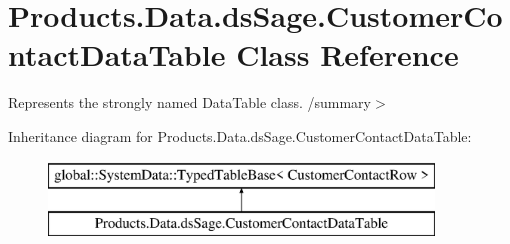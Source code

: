 \hypertarget{class_products_1_1_data_1_1ds_sage_1_1_customer_contact_data_table}{}\section{Products.\+Data.\+ds\+Sage.\+Customer\+Contact\+Data\+Table Class Reference}
\label{class_products_1_1_data_1_1ds_sage_1_1_customer_contact_data_table}


Represents the strongly named Data\+Table class. /summary$>$  


Inheritance diagram for Products.\+Data.\+ds\+Sage.\+Customer\+Contact\+Data\+Table\+:\begin{figure}[H]
\begin{center}
\leavevmode
\includegraphics[height=2.000000cm]{class_products_1_1_data_1_1ds_sage_1_1_customer_contact_data_table}
\end{center}
\end{figure}
